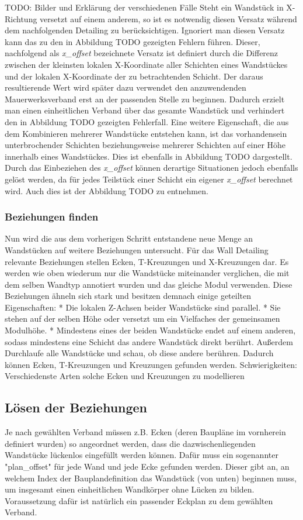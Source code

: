 TODO: Bilder und Erklärung der verschiedenen Fälle
Steht ein Wandstück in X-Richtung versetzt auf einem anderem, so ist es notwendig diesen Versatz während dem nachfolgenden Detailing zu berücksichtigen.
Ignoriert man diesen Versatz kann das zu den in Abbildung TODO gezeigten Fehlern führen.
Dieser, nachfolgend als \textit{x\_offset} bezeichnete Versatz ist definiert durch die Differenz zwischen der kleinsten lokalen X-Koordinate aller Schichten eines Wandstückes und der lokalen X-Koordinate der zu betrachtenden Schicht.
Der daraus resultierende Wert wird später dazu verwendet den anzuwendenden Mauerwerksverband erst an der passenden Stelle zu beginnen.
Dadurch erzielt man einen einheitlichen Verband über das gesamte Wandstück und verhindert den in Abbildung TODO gezeigten Fehlerfall.
Eine weitere Eigenschaft, die aus dem Kombinieren mehrerer Wandstücke entstehen kann, ist das vorhandensein unterbrochender Schichten beziehungsweise mehrerer Schichten auf einer Höhe innerhalb eines Wandstückes.
Dies ist ebenfalls in Abbildung TODO dargestellt.
Durch das Einbeziehen des \textit{x\_offset} können derartige Situationen jedoch ebenfalls gelöst werden, da für jedes Teilstück einer Schicht ein eigener \textit{x\_offset} berechnet wird.
Auch dies ist der Abbildung TODO zu entnehmen.

\subsubsection{Beziehungen finden}
Nun wird die aus dem vorherigen Schritt entstandene neue Menge an Wandstücken auf weitere Beziehungen untersucht.
Für das Wall Detailing relevante Beziehungen stellen Ecken, T-Kreuzungen und X-Kreuzungen dar.
Es werden wie oben wiederum nur die Wandstücke miteinander verglichen, die mit dem selben Wandtyp annotiert wurden und das gleiche Modul verwenden.
Diese Beziehungen ähneln sich stark und besitzen demnach einige geteilten Eigenschaften:
* Die lokalen Z-Achsen beider Wandstücke sind parallel.
* Sie stehen auf der selben Höhe oder versetzt um ein Vielfaches der gemeinsamen Modulhöhe.
* Mindestens eines der beiden Wandstücke endet auf einem anderen, sodass mindestens eine Schicht das andere Wandstück direkt berührt.
Außerdem 
Durchlaufe alle Wandstücke und schau, ob diese andere berühren.
Dadurch können Ecken, T-Kreuzungen und Kreuzungen gefunden werden.
Schwierigkeiten: Verschiedenste Arten solche Ecken und Kreuzungen zu modellieren 

\subsection{Lösen der Beziehungen}
Je nach gewählten Verband müssen z.B. Ecken (deren Baupläne im vornherein definiert wurden) so angeordnet werden, dass die dazwischenliegenden Wandstücke lückenlos eingefüllt werden können.
Dafür muss ein sogenannter "plan\_offset" für jede Wand und jede Ecke gefunden werden. Dieser gibt an, an welchem Index der Bauplandefinition das Wandstück (von unten) beginnen muss, um insgesamt einen einheitlichen Wandkörper ohne Lücken zu bilden.
Voraussetzung dafür ist natürlich ein passender Eckplan zu dem gewählten Verband. 

